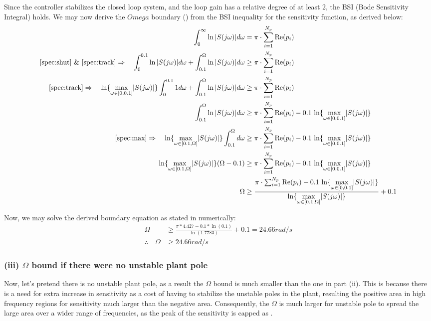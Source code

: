 \documentclass{tron}
\begin{document}
Since the controller stabilizes the closed loop system, and the loop gain has a relative degree of at least 2, the \Gls{BSI} (Bode Sensitivity Integral) holds. We may now derive the $Omega$ boundary () from the \Gls{BSI} inequality for the sensitivity function, as derived below:
\begin{align}
	\int_0^{\infty} \ln |S(j\omega)| d\omega 	& = \pi \cdot \sum_{i=1}^{N_p} \Re(p_i) \\
\text{\Cref{spec:shut} \& \Cref{spec:track}} \Rightarrow \quad 	\int_0^{0.1} \ln |S(j\omega)| d\omega + \int_{0.1}^{\Omega} \ln |S(j\omega)| d\omega & \geq \pi \cdot \sum_{i=1}^{N_p} \Re(p_i) \\
\text{\Cref{spec:track}} \Rightarrow \quad 	\ln \{\underset{\omega \in [0, 0.1]}{\max}|S(j\omega)|\} \int_0^{0.1} 1 d\omega + \int_{0.1}^{\Omega} \ln |S(j\omega)| d\omega & \geq \pi \cdot \sum_{i=1}^{N_p} \Re(p_i) \\
  \int_{0.1}^{\Omega} \ln |S(j\omega)| d\omega & \geq \pi \cdot \sum_{i=1}^{N_p} \Re(p_i) - 0.1 \, \ln \{\underset{\omega \in [0, 0.1]}{\max}|S(j\omega)|\}\\
\text{\Cref{spec:max}} \Rightarrow \quad 	\ln \{\underset{\omega \in [0.1, \Omega]}{\max}|S(j\omega)|\} \int_{0.1}^{\Omega}  d\omega & \geq \pi \cdot \sum_{i=1}^{N_p} \Re(p_i) - 0.1 \, \ln \{\underset{\omega \in [0, 0.1]}{\max}|S(j\omega)|\}\\
\ln \{\underset{\omega \in [0.1, \Omega]}{\max}|S(j\omega)|\} (\Omega - 0.1) & \geq \pi \cdot \sum_{i=1}^{N_p} \Re(p_i) - 0.1 \, \ln \{\underset{\omega \in [0, 0.1]}{\max}|S(j\omega)|\} \\
\Omega & \geq \frac{\pi \cdot \sum_{i=1}^{N_p} \Re(p_i) - 0.1 \, \ln \{\underset{\omega \in [0, 0.1]}{\max}|S(j\omega)|\}}{\ln \{\underset{\omega \in [0.1, \Omega]}{\max}|S(j\omega)|\} } + 0.1 \label{eqn:omega:bnd}
\end{align}

Now, we may solve the derived boundary equation as stated in  numerically:
\begin{align}
	\Omega & \geq \frac{\pi * 4.427 - 0.1 * \ln(0.1)}{\ln(1.7783)} + 0.1 = 24.66 \unit{rad/s}\\
	\therefore\quad \Omega & \geq 24.66 \unit{rad/s}
\end{align}

\subsubsection{(iii) $\Omega$ bound if there were no unstable plant pole}
Now, let's pretend there is no unstable plant pole, as a result the $\Omega$ bound is much smaller than the one in part (ii). This is because there is a need for extra increase in sensitivity as a cost of having to stabilize the unstable poles in the plant, resulting the positive area in high frequency regions for sensitivity much larger than the negative area. Consequently, the $\Omega$ is much larger for unstable pole to spread the large area over a wider range of frequencies, as the peak of the sensitivity is capped as . 
\end{document}

